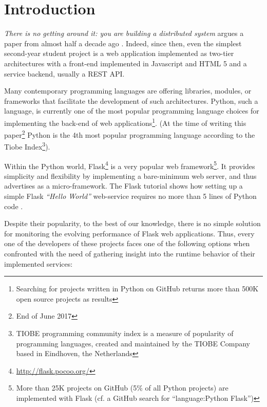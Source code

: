 \documentclass[conference]{IEEEtran}
\begin{document}

\IEEEpeerreviewmaketitle



\section{Introduction}

{\em There is no getting around it: you are building a distributed system} argues a paper from almost half a decade ago \cite{cavage2013there}. Indeed, since then, even the simplest second-year student project is a web application implemented as two-tier architectures with a front-end implemented in Javascript and HTML 5 and a service backend, usually a REST API.

Many contemporary programming languages are offering libraries, modules, or frameworks that facilitate the development of such architectures. Python, such a language, is currently one of the most popular programming language choices for implementing the back-end of web applications\footnote{Searching for projects written in Python on GitHub returns more than 500K open source projects as results}. (At the time of writing this paper\footnote{End of June 2017} Python is the 4th most popular programming language according to the Tiobe Index\footnote{TIOBE programming community index is a measure of popularity of programming languages, created and maintained by the TIOBE Company based in Eindhoven, the Netherlands}).
 
Within the Python world, Flask\footnote{\url{http://flask.pocoo.org/}} is a very popular web framework\footnote{More than 25K projects on GitHub (5\% of all Python projects) are implemented with Flask (cf. a GitHub search for ``language:Python Flask'')}. It provides simplicity and flexibility by implementing a bare-minimum web server, and thus advertises as a micro-framework. The Flask tutorial shows how setting up a simple Flask {\em ``Hello World''} web-service requires no more than 5 lines of Python code \cite{ flask:tutorial}.
 
Despite their popularity, to the best of our knowledge, there is no simple solution for monitoring the evolving performance of Flask web applications. Thus, every one of the developers of these projects faces one of the following options when confronted with the need of gathering insight into the runtime behavior of their implemented services: 
\end{document}
